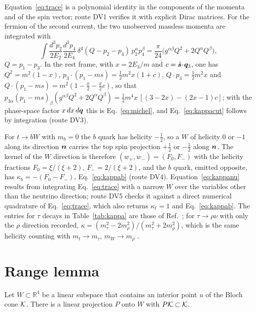 Equation~\eqref{eq:trace} is a polynomial identity in the components of the momenta and of the spin vector; route DV1 verifies it with explicit Dirac matrices. For the fermion of the second current, the two unobserved massless momenta are integrated with
\begin{equation}
\int\!\frac{d^3p_2}{2E_2}\frac{d^3p_4}{2E_4}\,\delta^4(Q-p_2-p_4)\,p_2^\alpha p_4^\beta=\frac{\pi}{24}\big(g^{\alpha\beta}Q^2+2Q^\alpha Q^\beta\big),
\end{equation}
$Q=p_1-p_3$. In the rest frame, with $x=2E_3/m$ and $c=\hat{\bm s}\!\cdot\!\bm{q}_3$, one has $Q^2=m^2(1-x)$, $p_3\!\cdot\!(p_1-ms)=\tfrac12m^2x(1+c)$, $Q\!\cdot\!p_3=\tfrac12m^2x$ and $Q\!\cdot\!(p_1-ms)=m^2(1-\tfrac x2-\tfrac x2c)$, so that $p_{3\alpha}(p_1-ms)_\beta(g^{\alpha\beta}Q^2+2Q^\alpha Q^\beta)=\tfrac12m^4x\,[(3-2x)-(2x-1)c]$; with the phase-space factor $x\,dx\,d\bm{q}$ this is Eq.~\eqref{eq:michel}, and Eq.~\eqref{eq:kappacut} follows by integration (route DV3).

For $t\to bW$ with $m_b=0$ the $b$ quark has helicity $-\tfrac12$, so a $W$ of helicity $0$ or $-1$ along its direction $\bm{n}$ carries the top spin projection $+\tfrac12$ or $-\tfrac12$ along $\bm{n}$. The kernel of the $W$ direction is therefore $(w_{+},w_{-})=(F_0,F_-)$ with the helicity fractions $F_0=\xi/(\xi+2)$, $F_-=2/(\xi+2)$, and the $b$ quark, emitted opposite, has $\kappa_b=-(F_0-F_-)$, Eq.~\eqref{eq:kappab} (route DV4). Equation~\eqref{eq:kappanu} results from integrating Eq.~\eqref{eq:trace} with a narrow $W$ over the variables other than the neutrino direction; route DV5 checks it against a direct numerical quadrature of Eq.~\eqref{eq:trace}, which also returns $\kappa_\ell=1$ and Eq.~\eqref{eq:kappab}. The entries for $\tau$ decays in Table~\ref{tab:kappa} are those of Ref.~\cite{tsai1971}; for $\tau\to\rho\nu$ with only the $\rho$ direction recorded, $\kappa=(m_\tau^2-2m_\rho^2)/(m_\tau^2+2m_\rho^2)$, which is the same helicity counting with $m_t\to m_\tau$, $m_W\to m_\rho$ \cite{pdg2024}.

\section{Range lemma}
\label{app:range}

\begin{lemma}
\label{lem:range}
Let $W\subset\mathbb{R}^4$ be a linear subspace that contains an interior point $u$ of the Bloch cone $\mathcal{K}$. There is a linear projection $P$ onto $W$ with $P\mathcal{K}\subset\mathcal{K}$.
\end{lemma}

